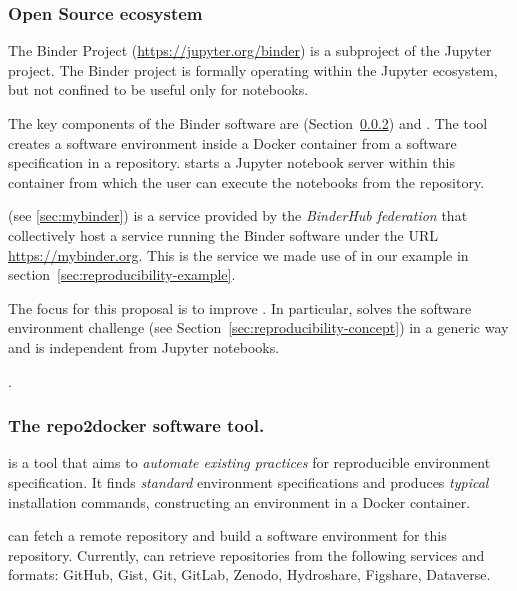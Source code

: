 \subsubsection{Open Source ecosystem}\label{seq:project-binder}

The Binder Project \cite{binder} (\url{https://jupyter.org/binder}) is
a subproject of the Jupyter project. The Binder project is formally operating
within the Jupyter ecosystem, but not confined to be useful only for notebooks.

The key components of the Binder software are \repotodocker{}
(Section~\ref{sec:repo2docker}) and \binderhub{}. The \repotodocker{} tool
creates a software environment inside a Docker container from a software
specification in a repository. \binderhub{} starts a Jupyter notebook server
within this container from which the user can execute the notebooks from the
repository.

\emph{\mybinder{}} (see \ref{sec:mybinder}) is a service provided by the \emph{BinderHub
  federation} that collectively host a service running the Binder software
under the URL \url{https://mybinder.org}. This is the service we made use of in
our example in section~\ref{sec:reproducibility-example}.

The focus for this proposal is to improve \repotodocker{}. In particular,
\repotodocker{} solves the software environment challenge (see
Section~\ref{sec:reproducibility-concept}) in a generic way and is independent
from Jupyter notebooks.

.

\subsubsection{The repo2docker software tool.}\label{sec:repo2docker}

\repotodocker{} is a tool that aims to \emph{automate existing practices} for reproducible environment specification.
It finds \emph{standard} environment specifications and produces \emph{typical} installation commands,
constructing an environment in a Docker container.

\repotodocker{} can fetch a remote repository and build a software
environment for this repository. Currently, \repotodocker{} can retrieve
repositories from the following services and formats: GitHub, Gist, Git, GitLab,
Zenodo, Hydroshare, Figshare, Dataverse.

